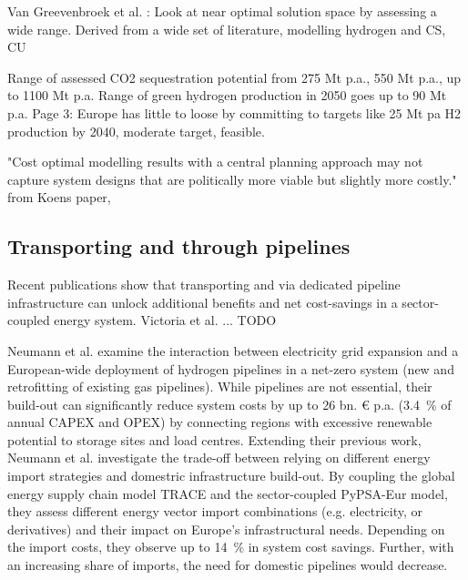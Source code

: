 \documentclass[preprint,12pt,sort&compress]{elsarticle}
\begin{document}
Van Greevenbroek et al. \cite{greevenbroekLittleLoseCase2024}: Look at near optimal solution space by assessing a wide range. Derived from a wide set of literature, modelling hydrogen and CS, CU \cite{fleiterHydrogenInfrastructureFuture2025,beresWillHydrogenSynthetic2024,blancoPotentialHydrogenPowertoLiquid2018,pickeringDiversityOptionsEliminate2022,schreyerDistinctRolesDirect2024,seckHydrogenDecarbonizationEnergy2022,neumannPotentialRoleHydrogen2023,zeyenEndogenousLearningGreen2023,kountourisUnifiedEuropeanHydrogen2024}

Range of assessed CO2 sequestration potential from 275 Mt p.a., 550 Mt p.a., up to 1100 Mt p.a. Range of green hydrogen production in 2050 goes up to 90 Mt p.a. Page 3: Europe has little to loose by committing to targets like 25 Mt pa H2 production by 2040, moderate target, feasible.

"Cost optimal modelling results with a central planning approach may not capture system designs that are politically more viable but slightly more costly." from Koens paper, \cite{trutnevyteDoesCostOptimization2016}

\subsection{Transporting  and  through pipelines}
Recent publications show that transporting  and  via dedicated pipeline infrastructure can unlock additional benefits and net cost-savings in a sector-coupled energy system. Victoria et al. \cite{victoriaSpeedTechnologicalTransformations2022a} ... TODO

Neumann et al. \cite{neumannPotentialRoleHydrogen2023} examine the interaction between electricity grid expansion and a European-wide deployment of hydrogen pipelines in a net-zero system (new and retrofitting of existing gas pipelines). While  pipelines are not essential, their build-out can significantly reduce system costs by up to 26 bn. \euro{} p.a. (\SI{3.4}{\percent} of annual CAPEX and OPEX) by connecting regions with excessive renewable potential to storage sites and load centres. 
Extending their previous work, Neumann et al. \cite{neumannEnergyImportsInfrastructure2024} investigate the trade-off between relying on different energy import strategies and domestric infrastructure build-out. By coupling the global energy supply chain model TRACE \cite{hamppImportOptionsChemical2023} and the sector-coupled PyPSA-Eur model, they assess different energy vector import combinations (e.g. electricity,  or  derivatives) and their impact on Europe's infrastructural needs. Depending on the import costs, they observe up to \SI{14}{\percent} in system cost savings. Further, with an increasing share of  imports, the need for domestic  pipelines would decrease. 
\end{document}
